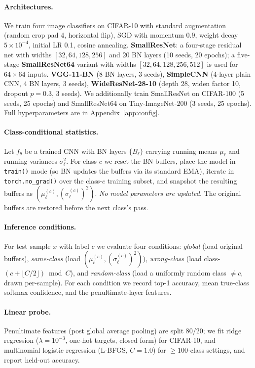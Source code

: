 \documentclass{article}
\begin{document}
\paragraph{Architectures.} We train four image classifiers on CIFAR-10 with standard augmentation (random crop pad 4, horizontal flip), SGD with momentum 0.9, weight decay $5{\times}10^{-4}$, initial LR 0.1, cosine annealing. \textbf{SmallResNet}: a four-stage residual net with widths $[32,64,128,256]$ and 20 BN layers (10 seeds, 20 epochs); a five-stage \textbf{SmallResNet64} variant with widths $[32,64,128,256,512]$ is used for $64{\times}64$ inputs. \textbf{VGG-11-BN} (8 BN layers, 3 seeds), \textbf{SimpleCNN} (4-layer plain CNN, 4 BN layers, 3 seeds), \textbf{WideResNet-28-10} \citep{zagoruyko2016wide} (depth 28, widen factor 10, dropout $p{=}0.3$, 3 seeds). We additionally train SmallResNet on CIFAR-100 (5 seeds, 25 epochs) and SmallResNet64 on Tiny-ImageNet-200 (3 seeds, 25 epochs). Full hyperparameters are in Appendix~\ref{app:config}.

\paragraph{Class-conditional statistics.} Let $f_\theta$ be a trained CNN with BN layers $\{B_\ell\}$ carrying running means $\mu_\ell$ and running variances $\sigma_\ell^2$. For class $c$ we reset the BN buffers, place the model in \texttt{train()} mode (so BN updates the buffers via its standard EMA), iterate in \texttt{torch.no\_grad()} over the class-$c$ training subset, and snapshot the resulting buffers as $(\mu_\ell^{(c)},(\sigma_\ell^{(c)})^2)$. \emph{No model parameters are updated.} The original buffers are restored before the next class's pass.

\paragraph{Inference conditions.} For test sample $x$ with label $c$ we evaluate four conditions: \emph{global} (load original buffers), \emph{same-class} (load $(\mu_\ell^{(c)},(\sigma_\ell^{(c)})^2)$), \emph{wrong-class} (load class-$(c+\lfloor C/2\rfloor) \bmod C$), and \emph{random-class} (load a uniformly random class $\neq c$, drawn per-sample). For each condition we record top-1 accuracy, mean true-class softmax confidence, and the penultimate-layer features.

\paragraph{Linear probe.} Penultimate features (post global average pooling) are split 80/20; we fit ridge regression ($\lambda{=}10^{-3}$, one-hot targets, closed form) for CIFAR-10, and multinomial logistic regression (L-BFGS, $C{=}1.0$) for $\geq 100$-class settings, and report held-out accuracy.
\end{document}
